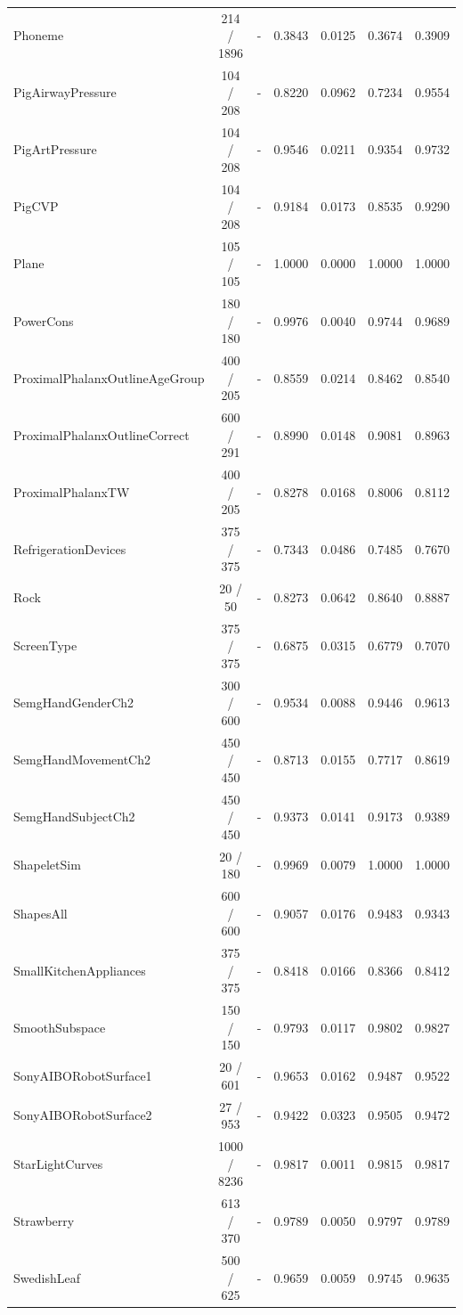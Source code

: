 \begin{longtable}{lcccccc}
Phoneme & 214 / 1896 & - & 0.3843 & 0.0125 & 0.3674 & 0.3909 \\
PigAirwayPressure & 104 / 208 & - & 0.8220 & 0.0962 & 0.7234 & 0.9554 \\
PigArtPressure & 104 / 208 & - & 0.9546 & 0.0211 & 0.9354 & 0.9732 \\
PigCVP & 104 / 208 & - & 0.9184 & 0.0173 & 0.8535 & 0.9290 \\
Plane & 105 / 105 & - & 1.0000 & 0.0000 & 1.0000 & 1.0000 \\
PowerCons & 180 / 180 & - & 0.9976 & 0.0040 & 0.9744 & 0.9689 \\
ProximalPhalanxOutlineAgeGroup & 400 / 205 & - & 0.8559 & 0.0214 & 0.8462 & 0.8540 \\
ProximalPhalanxOutlineCorrect & 600 / 291 & - & 0.8990 & 0.0148 & 0.9081 & 0.8963 \\
ProximalPhalanxTW & 400 / 205 & - & 0.8278 & 0.0168 & 0.8006 & 0.8112 \\
RefrigerationDevices & 375 / 375 & - & 0.7343 & 0.0486 & 0.7485 & 0.7670 \\
Rock & 20 / 50 & - & 0.8273 & 0.0642 & 0.8640 & 0.8887 \\
ScreenType & 375 / 375 & - & 0.6875 & 0.0315 & 0.6779 & 0.7070 \\
SemgHandGenderCh2 & 300 / 600 & - & 0.9534 & 0.0088 & 0.9446 & 0.9613 \\
SemgHandMovementCh2 & 450 / 450 & - & 0.8713 & 0.0155 & 0.7717 & 0.8619 \\
SemgHandSubjectCh2 & 450 / 450 & - & 0.9373 & 0.0141 & 0.9173 & 0.9389 \\
ShapeletSim & 20 / 180 & - & 0.9969 & 0.0079 & 1.0000 & 1.0000 \\
ShapesAll & 600 / 600 & - & 0.9057 & 0.0176 & 0.9483 & 0.9343 \\
SmallKitchenAppliances & 375 / 375 & - & 0.8418 & 0.0166 & 0.8366 & 0.8412 \\
SmoothSubspace & 150 / 150 & - & 0.9793 & 0.0117 & 0.9802 & 0.9827 \\
SonyAIBORobotSurface1 & 20 / 601 & - & 0.9653 & 0.0162 & 0.9487 & 0.9522 \\
SonyAIBORobotSurface2 & 27 / 953 & - & 0.9422 & 0.0323 & 0.9505 & 0.9472 \\
StarLightCurves & 1000 / 8236 & - & 0.9817 & 0.0011 & 0.9815 & 0.9817 \\
Strawberry & 613 / 370 & - & 0.9789 & 0.0050 & 0.9797 & 0.9789 \\
SwedishLeaf & 500 / 625 & - & 0.9659 & 0.0059 & 0.9745 & 0.9635 \\

\end{longtable}
